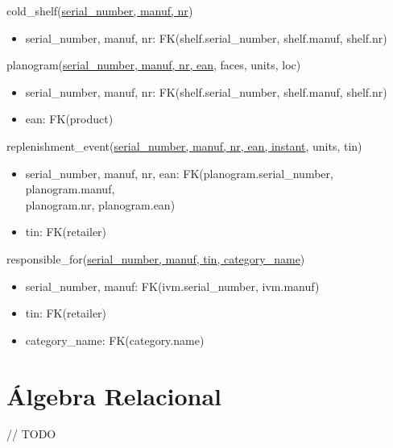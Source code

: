 \documentclass[12pt,a4paper]{article}
\begin{document}
  \noindent
  cold\_shelf(\underline{serial\_number, manuf, nr})
  \begin{itemize}[nosep]
    \item serial\_number, manuf, nr: FK(shelf.serial\_number, shelf.manuf, shelf.nr)
  \end{itemize}
  
  \vspace*{10pt}
  
  \noindent
  planogram(\underline{serial\_number, manuf, nr, ean}, faces, units, loc)
  \begin{itemize}[nosep]
    \item serial\_number, manuf, nr: FK(shelf.serial\_number, shelf.manuf, shelf.nr)
    \item ean: FK(product)
  \end{itemize}
  
  \vspace*{10pt}
  
  \noindent
  replenishment\_event(\underline{serial\_number, manuf, nr, ean, instant}, units, tin)
  \begin{itemize}[nosep]
    \item serial\_number, manuf, nr, ean: FK(planogram.serial\_number, planogram.manuf,\\ planogram.nr, planogram.ean)
    \item tin: FK(retailer)
  \end{itemize}
  
  \vspace*{10pt}
  
  \noindent
  responsible\_for(\underline{serial\_number, manuf, tin, category\_name})
  \begin{itemize}[nosep]
    \item serial\_number, manuf: FK(ivm.serial\_number, ivm.manuf)
    \item tin: FK(retailer)
    \item category\_name: FK(category.name)
  \end{itemize}

  \sffamily
  \section*{Álgebra Relacional}
  
  // TODO
\end{document}
